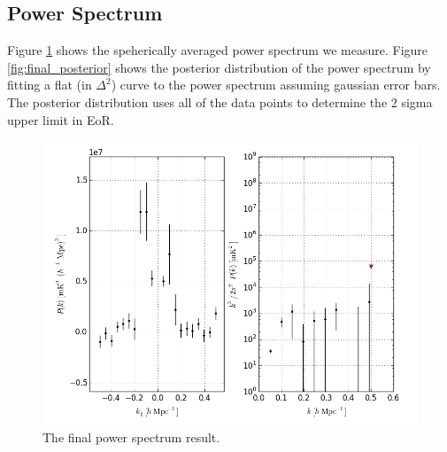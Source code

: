 \documentclass[twocolumn,numberedappendix]{emulateapj} \shorttitle{PSA64}
\begin{document}
\subsection{Power Spectrum}
Figure \ref{fig:final_pspec} shows the speherically averaged power spectrum we
measure. Figure \ref{fig:final_posterior} shows the posterior distribution of
the power spectrum by fitting a flat (in $\Delta^{2}$) curve to the
power spectrum assuming gaussian error bars. The posterior distribution uses all
of the data points to determine the 2 sigma upper limit in EoR.
%
\begin{figure}[h!]\centering
\includegraphics[width=1.5\columnwidth, height=1\columnwidth]{plots/pk_k3pk.png}
\caption{The final power spectrum result.}
\label{fig:final_pspec}
\end{figure}
\end{document}
